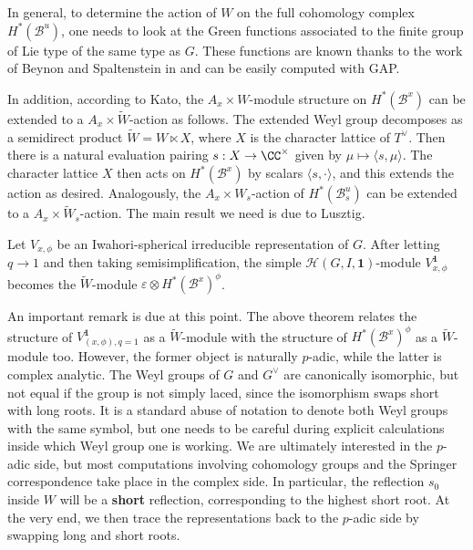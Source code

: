 In general, to determine the action of $W$ on the full cohomology complex $H^*(\mathcal{B}^u)$, one needs to look at the Green functions associated to the finite group of Lie type of the same type as $G$. These functions are known thanks to the work of Beynon and Spaltenstein in \cite{BeynonSpaltenstein1984} and can be easily computed with GAP.

In addition, according to Kato, the $A_x\times W$-module structure on $H^*(\mathcal{B}^x)$ can be extended to a $A_x\times\widetilde{W}$-action as follows. The extended Weyl group decomposes as a semidirect product $\widetilde{W}=W\ltimes X$, where $X$ is the character lattice of $T^\vee$. Then there is a natural evaluation pairing $s:X\rightarrow \CC^\times$ given by $\mu\mapsto\langle s,\mu\rangle$. The character lattice $X$ then acts on $H^*(\mathcal{B}^x)$ by scalars $\langle s,\cdot\rangle$, and this extends the action as desired. Analogously, the $A_x\times W_s$-action of $H^*(\mathcal{B}^u_s)$ can be extended to a $A_x\times\widetilde{W}_s$-action. The main result we need is due to Lusztig.

\begin{theorem}%
    Let $V_{x,\phi}$ be an Iwahori-spherical irreducible representation of $G$. After letting $q\rightarrow 1$ and then taking semisimplification, the simple $\mathcal{H}(G,I,\mathbf{1})$-module $V^\mathbf{1}_{x,\phi}$ becomes the $\widetilde{W}$-module $\varepsilon\otimes H^*(\mathcal{B}^x)^\phi$. 
\end{theorem}

\begin{remark}%
    An important remark is due at this point. The above theorem relates the structure of $V^\mathbf{1}_{(x,\phi),q=1}$ as a $\widetilde{W}$-module with the structure of $H^*(\mathcal{B}^x)^\phi$ as a $\widetilde{W}$-module too. However, the former object is naturally $p$-adic, while the latter is complex analytic. The Weyl groups of $G$ and $G^\vee$ are canonically isomorphic, but not equal if the group is not simply laced, since the isomorphism swaps short with long roots. It is a standard abuse of notation to denote both Weyl groups with the same symbol, but one needs to be careful during explicit calculations inside which Weyl group one is working. We are ultimately interested in the $p$-adic side, but most computations involving cohomology groups and the Springer correspondence take place in the complex side. In particular, the reflection $s_0$ inside $W$ will be a \textbf{short} reflection, corresponding to the highest short root. At the very end, we then trace the representations back to the $p$-adic side by swapping long and short roots. 
\end{remark}

